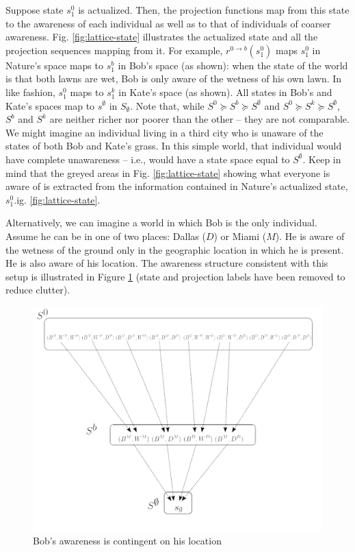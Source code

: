 \documentclass[
11pt,
titlepage,
reqno,
]{article}%
\theoremstyle{definition}
\begin{document}
Suppose state $s^0_1$ is actualized. 
Then, the projection functions map from this state to the awareness of each individual as well as to that of individuals of coarser awareness.
Fig. \ref{fig:lattice-state} illustrates the actualized state and all the projection sequences mapping from it.
For example,  $r^{0\rightarrow b}(s^0_1)$ maps $s^0_1$ in Nature's space maps to $s^b_1$ in Bob's space (as shown): when the state of the world is that both lawns are wet, Bob is only aware of the wetness of his own lawn.
In like fashion, $s^0_1$ maps to $s^k_1$ in Kate's space (as shown).
All states in Bob's and Kate's spaces map to $s^\emptyset$ in $S_\emptyset$.
Note that, while $S^0\succeq S^b\succeq S^\emptyset$ and $S^0\succeq S^k\succeq S^\emptyset$, $S^b$ and $S^k$ are neither richer nor poorer than the other -- they are not comparable.
We might imagine an individual living in a third city who is unaware of the states of both Bob and Kate's grass.
In this simple world, that individual would have complete unawareness -- i.e., would have a state space equal to $S^\emptyset$.
Keep in mind that the greyed areas in Fig. \ref{fig:lattice-state} showing what everyone is aware of is extracted from the information contained in Nature's actualized state, $s^0_1$.ig. \ref{fig:lattice-state}.
	
Alternatively, we can imagine a world in which Bob is the only individual.
Assume he can be in one of two places: Dallas ($D$) or Miami ($M$). 
He is aware of the wetness of the ground only in the geographic location in which he is present.
He is also aware of his location. 
The awareness structure consistent with this setup is illustrated in Figure \ref{Fig:Bob Location} (state and projection labels have been removed to reduce clutter).

\begin{figure}[h!]	
	\begin{center}
		\includegraphics[scale=.4]{Bob-Location.png}
	\end{center}
\caption{Bob's awareness is contingent on his location\label{Fig:Bob Location}}
\end{figure}
\end{document}
